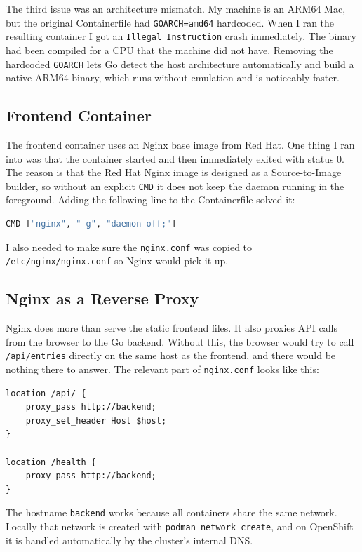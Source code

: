 The third issue was an architecture mismatch. My machine is an ARM64 Mac, but the
original Containerfile had \texttt{GOARCH=amd64} hardcoded. When I ran the resulting
container I got an \texttt{Illegal Instruction} crash immediately. The binary had been
compiled for a CPU that the machine did not have. Removing the hardcoded \texttt{GOARCH}
lets Go detect the host architecture automatically and build a native ARM64 binary, which
runs without emulation and is noticeably faster.

\subsection{Frontend Container}

The frontend container uses an Nginx base image from Red Hat. One thing I ran into was
that the container started and then immediately exited with status 0. The reason is that
the Red Hat Nginx image is designed as a Source-to-Image builder, so without an explicit
\texttt{CMD} it does not keep the daemon running in the foreground. Adding the following
line to the Containerfile solved it:

\begin{lstlisting}[language=bash]
CMD ["nginx", "-g", "daemon off;"]
\end{lstlisting}

I also needed to make sure the \texttt{nginx.conf} was copied to
\texttt{/etc/nginx/nginx.conf} so Nginx would pick it up.

\subsection{Nginx as a Reverse Proxy}

Nginx does more than serve the static frontend files. It also proxies API calls from the
browser to the Go backend. Without this, the browser would try to call
\texttt{/api/entries} directly on the same host as the frontend, and there would be
nothing there to answer. The relevant part of \texttt{nginx.conf} looks like this:

\begin{lstlisting}
location /api/ {
    proxy_pass http://backend;
    proxy_set_header Host $host;
}

location /health {
    proxy_pass http://backend;
}
\end{lstlisting}

The hostname \texttt{backend} works because all containers share the same network.
Locally that network is created with \texttt{podman network create}, and on OpenShift it
is handled automatically by the cluster's internal DNS.

